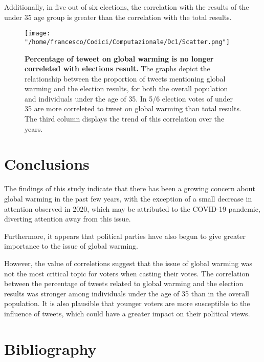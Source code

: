 \documentclass[a4paper,10pt,rmp,superscriptaddress]{revtex4}
\begin{document}
Additionally, in five out of six elections, the correlation with the results of the under 35 age group is greater than the correlation 
with the total results. 
\begin{figure}[h!]
    \centering
    \texttt{[image: "/home/francesco/Codici/Computazionale/Dc1/Scatter.png"]}
    \caption[short]{\textbf{Percentage of teweet on global warming is no longer correleted with elections result.} 
    The graphs depict the relationship between the proportion of tweets mentioning global warming and the election results, 
    for both the overall population and individuals under the age of 35.
    In 5/6 election votes of under 35 are more correleted to tweet on global warming than total results.
    The third column displays the trend of this correlation over the years.}
    \label{fig:3}
\end{figure}

\section*{Conclusions}
The findings of this study indicate that there has been a growing concern about global warming in the past few years, 
with the exception of a small decrease in attention observed in 2020, which may be attributed to the COVID-19 pandemic, 
diverting attention away from this issue.

Furthermore, it appears that political parties have also begun to give greater 
importance to the issue of global warming.
 
However, the value of correletions suggest that the issue of global warming was not the most critical topic for voters when casting 
their votes. 
The correlation between the percentage of tweets related to global warming and the election results was stronger among individuals 
under the age of 35 than in the overall population. It is also plausible that younger voters are more susceptible to the influence of tweets, 
which could have a greater impact on their political views.
\section*{Bibliography}
\end{document}
